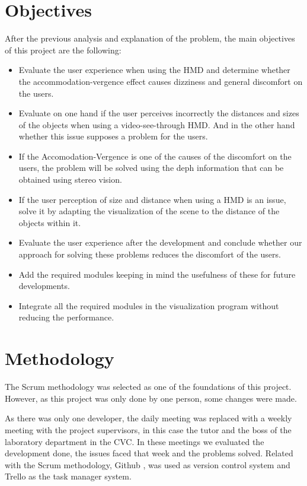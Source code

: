 \documentclass[10pt,a4paper,twocolumn,twoside]{article}
\begin{document}
	\section{Objectives}
	After the previous analysis and explanation of the problem, the main objectives of this project are the following: 

	\begin{itemize}
		\item Evaluate the user experience when using the HMD and determine whether the accommodation-vergence effect causes dizziness and general discomfort on the users. 
		
		\item Evaluate on one hand if the user perceives incorrectly the distances and sizes of the objects when using a video-see-through HMD. And in the other hand whether this issue supposes a problem for the users.
		
		\item If the Accomodation-Vergence is one of the causes of the discomfort on the users, the problem will be solved using the deph information that can be obtained using stereo vision. 
		
		\item If the user perception of size and distance when using a HMD is an issue, solve it by adapting the visualization of the scene to the distance of the objects within it.
		
		\item Evaluate the user experience after the development and conclude whether our approach for solving these problems reduces the discomfort of the users. 
		
		\item Add the required modules keeping in mind the usefulness of these for future developments.
		
		\item Integrate all the required modules in the visualization program without reducing the performance. 
	\end{itemize}

	\section{Methodology}

	
	The Scrum methodology was selected as one of the foundations of this project. However, as this project was only done by one person, some changes were made. 
	
	As there was only one developer, the daily meeting was replaced with a weekly meeting with the project supervisors, in this case the tutor and the boss of the laboratory department in the CVC. In these meetings we evaluated the development done, the issues faced that week and the problems solved. Related with the Scrum methodology, Github \cite{web:github}, \cite{web:githubDesktop} was used as version control system and Trello \cite{web:trello} as the task manager system.
	
\end{document}

